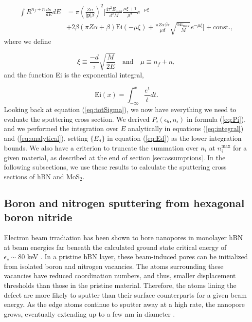 \documentclass{article}
\begin{document}
\begin{equation}
  \begin{aligned}
    \int R^{n_f+n} \frac{d\sigma}{dE} dE
    &=
    \pi\left(\frac{Z\alpha}{|\mathbf{p}|\beta}\right)^2
    \bigg[
      \frac{4\tau^2 E_\text{max}}{d^2M} \frac{\mu\xi+1}{\mu^2} e^{-\mu\xi}
      \\&+
      2\beta(\pi Z\alpha+\beta)\text{Ei}(-\mu\xi)
      +
      \frac{\pi Z\alpha\beta\tau}{\mu d}\sqrt{\frac{8E_\text{max}}{M}}
      e^{-\mu\xi}
    \bigg]
    +\text{const}.,
  \end{aligned}
  \label{eq:analytical}
\end{equation}
%
where we define

\begin{equation}
  \xi \equiv \frac{-d}{\tau} \sqrt{\frac{M}{2E}}
  \quad\text{and}\quad
  \mu \equiv n_f + n,
  \label{eq:xi}
\end{equation}
%
and the function Ei is the exponential integral,

\begin{equation}
  \text{Ei}(x) = \int_{-\infty}^x \frac{e^t}{t}dt.
  \label{eq:Ei}
\end{equation}
%
Looking back at equation (\ref{eq:totSigma}), we now have everything we need to
evaluate the sputtering cross section.
We derived $P_i(\epsilon_b, n_i)$ in formula (\ref{eq:Pi}), and we performed
the integration over $E$ analytically in equations (\ref{eq:integral}) and
(\ref{eq:analytical}), setting $\{E_d\}$ in equation (\ref{eq:Ed}) as the lower
integration bounds.
We also have a criterion to truncate the summation over $n_i$ at
$n_i^\text{max}$ for a given material, as described at the end of section
\ref{sec:assumptions}.
In the following subsections, we use these results to calculate the sputtering
cross sections of hBN and MoS$_2$.


\subsection{Boron and nitrogen sputtering from hexagonal boron nitride}
\label{sec:hBN}

Electron beam irradiation has been shown to bore nanopores in monolayer hBN at
beam energies far beneath the calculated ground state critical energy of
$\epsilon_c\sim80$ keV \cite{Jin2009,Meyer2009,Kotakoski2010,Cretu2015}.
In a pristine hBN layer, these beam-induced pores can be initialized from
isolated boron and nitrogen vacancies.
The atoms surrounding these vacancies have reduced coordination numbers, and
thus, smaller displacement thresholds than those in the pristine material.
Therefore, the atoms lining the defect are more likely to sputter than their
surface counterparts for a given beam energy.
As the edge atoms continue to sputter away at a high rate, the nanopore grows,
eventually extending up to a few nm in diameter
\cite{Meyer2009,Cretu2015,Dogan2020}.
\end{document}
